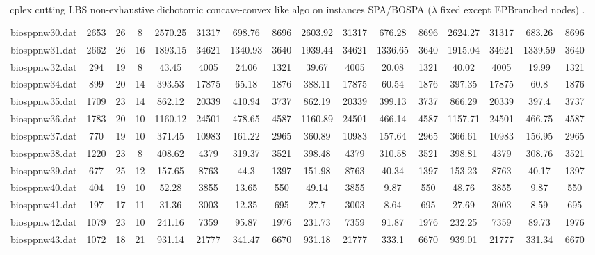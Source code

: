 \begin{sidewaystable}[!ht]
{\begin{tabular}{lccccccccccccccc}
biosppnw30.dat & 2653 & 26 & 8 & 2570.25 & 31317 & 698.76 & 8696 & 2603.92 & 31317 &  \textcolor{blue2}{676.28} & 8696 & 2624.27 & 31317 & 683.26 & 8696 \\
biosppnw31.dat & 2662 & 26 & 16 & 1893.15 & 34621 & 1340.93 & 3640 & 1939.44 & 34621 &  \textcolor{blue2}{1336.65} & 3640 & 1915.04 & 34621 & 1339.59 & 3640 \\
biosppnw32.dat & 294 & 19 & 8 & 43.45 & 4005 & 24.06 & 1321 & 39.67 & 4005 & 20.08 & 1321 & 40.02 & 4005 & 19.99 & 1321 \\
biosppnw34.dat & 899 & 20 & 14 & 393.53 & 17875 & 65.18 & 1876 & 388.11 & 17875 & 60.54 & 1876 & 397.35 & 17875 & 60.8 & 1876 \\
biosppnw35.dat & 1709 & 23 & 14 & 862.12 & 20339 & 410.94 & 3737 & 862.19 & 20339 & 399.13 & 3737 & 866.29 & 20339 &  \textcolor{blue2}{397.4} & 3737 \\
biosppnw36.dat & 1783 & 20 & 10 & 1160.12 & 24501 & 478.65 & 4587 & 1160.89 & 24501 &  \textcolor{blue2}{466.14} & 4587 & 1157.71 & 24501 & 466.75 & 4587 \\
biosppnw37.dat & 770 & 19 & 10 & 371.45 & 10983 & 161.22 & 2965 & 360.89 & 10983 & 157.64 & 2965 & 366.61 & 10983 & 156.95 & 2965 \\
biosppnw38.dat & 1220 & 23 & 8 & 408.62 & 4379 & 319.37 & 3521 & 398.48 & 4379 & 310.58 & 3521 & 398.81 & 4379 &  \textcolor{blue2}{308.76} & 3521 \\
biosppnw39.dat & 677 & 25 & 12 & 157.65 & 8763 & 44.3 & 1397 & 151.98 & 8763 & 40.34 & 1397 & 153.23 & 8763 & 40.17 & 1397 \\
biosppnw40.dat & 404 & 19 & 10 & 52.28 & 3855 & 13.65 & 550 & 49.14 & 3855 & 9.87 & 550 & 48.76 & 3855 & 9.87 & 550 \\
biosppnw41.dat & 197 & 17 & 11 & 31.36 & 3003 & 12.35 & 695 & 27.7 & 3003 & 8.64 & 695 & 27.69 & 3003 & 8.59 & 695 \\
biosppnw42.dat & 1079 & 23 & 10 & 241.16 & 7359 & 95.87 & 1976 & 231.73 & 7359 & 91.87 & 1976 & 232.25 & 7359 & 89.73 & 1976 \\
biosppnw43.dat & 1072 & 18 & 21 & 931.14 & 21777 & 341.47 & 6670 & 931.18 & 21777 & 333.1 & 6670 & 939.01 & 21777 & 331.34 & 6670 \\
\bottomrule
\end{tabular}
}%
\caption{cplex cutting LBS non-exhaustive dichotomic concave-convex like algo on instances SPA/BOSPA ($\lambda$ fixed except EPBranched nodes) .}
\end{sidewaystable}
